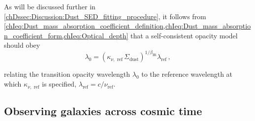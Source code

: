 As will be discussed further in \cref{chDssec:Discussion:Dust_SED_fitting_procedure}, it follows from \cref{chIeq:Dust_mass_absorption_coefficient_definition,chIeq:Dust_mass_absorption_coefficient_form,chIeq:Optical_depth} that a self-consistent opacity model should obey
\begin{equation}
    \label{chIeq:Consistent_l0}
    \lambda_0 = \left( \kappa_{\nu, \text{ ref}} \, \Sigma_\text{dust} \right)^{1/\beta_\text{IR}} \lambda_\text{ref} \, ,
\end{equation}

\noindent relating the transition opacity wavelength $\lambda_0$ to the reference wavelength at which $\kappa_{\nu, \text{ ref}}$ is specified, $\lambda_\text{ref} = c/\nu_\text{ref}$.

\subsection{Observing galaxies across cosmic time}
\label{chIssec:Observing_galaxies_across_cosmic_time}

